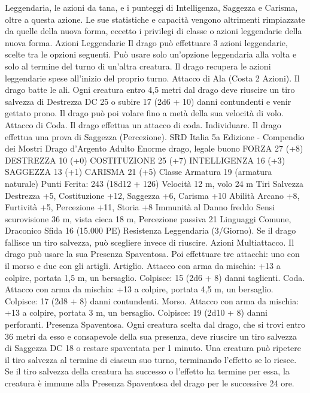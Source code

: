 \begin{multicols}{2}
Leggendaria, le azioni da tana, e i punteggi di Intelligenza, Saggezza
e Carisma, oltre a questa azione. Le sue statistiche e capacità
vengono altrimenti rimpiazzate da quelle della nuova forma, eccetto i
privilegi di classe o azioni leggendarie della nuova forma.
Azioni Leggendarie
Il drago può effettuare 3 azioni leggendarie, scelte tra le opzioni
seguenti. Può usare solo un’opzione leggendaria alla volta e solo
al termine del turno di un’altra creatura. Il drago recupera le
azioni leggendarie spese all’inizio del proprio turno.
Attacco di Ala (Costa 2 Azioni). Il drago batte le ali. Ogni
creatura entro 4,5 metri dal drago deve riuscire un tiro salvezza
di Destrezza DC 25 o subire 17 (2d6 + 10) danni contundenti e
venir gettato prono. Il drago può poi volare fino a metà della sua
velocità di volo.
Attacco di Coda. Il drago effettua un attacco di coda.
Individuare. Il drago effettua una prova di Saggezza
(Percezione).
SRD Italia 5a Edizione - Compendio dei Mostri
Drago d’Argento Adulto
Enorme drago, legale buono
FORZA 27 (+8)
DESTREZZA 10 (+0)
COSTITUZIONE 25 (+7)
INTELLIGENZA 16 (+3)
SAGGEZZA 13 (+1)
CARISMA 21 (+5)
Classe Armatura 19 (armatura naturale)
\hspace*{0pt}\hfill{Punti Ferita}: 243 (18d12 + 126)
Velocità 12 m, volo 24 m
Tiri Salvezza Destrezza +5, Costituzione +12, Saggezza +6,
Carisma +10
Abilità Arcano +8, Furtività +5, Percezione +11, Storia +8
Immunità al Danno freddo
Sensi scurovisione 36 m, vista cieca 18 m, Percezione passiva 21
Linguaggi Comune, Draconico
Sfida 16 (15.000 PE)
Resistenza Leggendaria (3/Giorno). Se il drago fallisce un tiro
salvezza, può scegliere invece di riuscire.
Azioni
Multiattacco. Il drago può usare la sua Presenza Spaventosa. Poi
effettuare tre attacchi: uno con il morso e due con gli artigli.
Artiglio. Attacco con arma da mischia: +13 a colpire, portata 1,5
m, un bersaglio.
Colpisce: 15 (2d6 + 8) danni taglienti.
Coda. Attacco con arma da mischia: +13 a colpire, portata 4,5
m, un bersaglio.
Colpisce: 17 (2d8 + 8) danni contundenti.
Morso. Attacco con arma da mischia: +13 a colpire, portata 3 m,
un bersaglio.
Colpisce: 19 (2d10 + 8) danni perforanti.
Presenza Spaventosa. Ogni creatura scelta dal drago, che si trovi
entro 36 metri da esso e consapevole della sua presenza, deve
riuscire un tiro salvezza di Saggezza DC 18 o restare spaventata per
1 minuto. Una creatura può ripetere il tiro salvezza al termine di
ciascun suo turno, terminando l’effetto se lo riesce. Se il tiro salvezza
della creatura ha successo o l’effetto ha termine per essa, la creatura è
immune alla Presenza Spaventosa del drago per le successive 24 ore.

\end{multicols}
